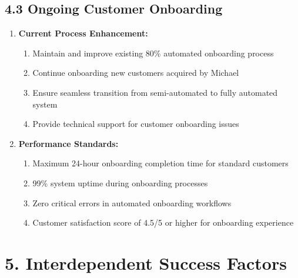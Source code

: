 \subsection*{4.3 Ongoing Customer Onboarding}
\begin{enumerate}[label=\arabic*.]
\item \textbf{Current Process Enhancement:}
    \begin{enumerate}[label=(\alph*)]
    \item Maintain and improve existing 80\% automated onboarding process
    \item Continue onboarding new customers acquired by Michael
    \item Ensure seamless transition from semi-automated to fully automated system
    \item Provide technical support for customer onboarding issues
    \end{enumerate}

\item \textbf{Performance Standards:}
    \begin{enumerate}[label=(\alph*)]
    \item Maximum 24-hour onboarding completion time for standard customers
    \item 99\% system uptime during onboarding processes
    \item Zero critical errors in automated onboarding workflows
    \item Customer satisfaction score of 4.5/5 or higher for onboarding experience
    \end{enumerate}
\end{enumerate}

\section*{5. Interdependent Success Factors}

